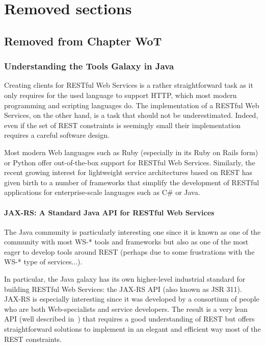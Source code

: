 \chapter{Removed sections}

\section{Removed from Chapter WoT}
\subsection{Understanding the Tools Galaxy in Java}
Creating clients for RESTful Web Services is a rather straightforward task as it only requires for the used language to support HTTP, which most modern programming and scripting languages do. The implementation of a RESTful Web Services, on the other hand, is a task that should not be underestimated. Indeed, even if the set of REST constraints is seemingly small their implementation requires a careful software design.

Most modern Web languages such as Ruby (especially in its Ruby on Rails form) or Python offer out-of-the-box support for RESTful Web Services. Similarly, the recent growing interest for lightweight service architectures based on REST has given birth to a number of frameworks that simplify the development of RESTful applications for enterprise-scale languages such as C\# or Java.

\subsubsection{JAX-RS: A Standard Java API for RESTful Web Services}
The Java community is particularly interesting one since it is known as one of the community with most WS-* tools and frameworks but also as one of the most eager to develop tools around REST (perhaps due to some frustrations with the WS-* type of services...).

In particular, the Java galaxy has its own higher-level industrial standard for building RESTful Web Services: the JAX-RS API (also known as JSR 311). JAX-RS is especially interesting since it was developed by a consortium of people who are both Web-specialists and service developers. The result is a very lean API (well described in~\cite{burke_restful_2009}) that requires a good understanding of REST but offers straightforward solutions to implement in an elegant and efficient way most of the REST constraints.

